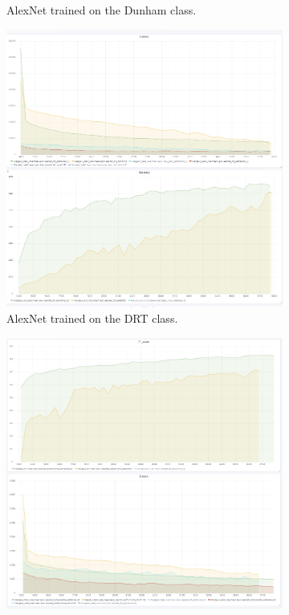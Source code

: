 \begin{figure}
\begin{subfigure}{.6\textwidth}
  \caption{AlexNet trained on the Dunham class.}
  \label{fig:alexinit_dunham}
\end{subfigure}
\begin{subfigure}{.5\textwidth}
  \centering
  \includegraphics[width=1\linewidth]{figures/04-Init_al_drt_acc.PNG}
  \caption{AlexNet trained on the DRT class.}
  \label{fig:alexinit_drt}
\end{subfigure}%
\begin{subfigure}{.6\textwidth}
  \centering
  \includegraphics[width=1\linewidth]{figures/04-al_components_acc.PNG}

\end{subfigure}
\end{figure}

